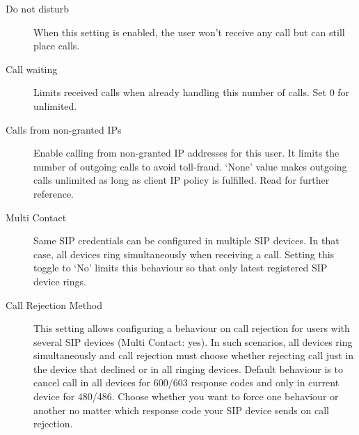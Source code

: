 \documentclass[letterpaper,10pt,spanish]{sphinxmanual}
\begin{document}
\begin{description}
\item[{Do not disturb}] \leavevmode{}\label{administration_portal/client/vpbx/users:term-do-not-disturb}
When this setting is enabled, the user won't receive any call but can
still place calls.

\item[{Call waiting}] \leavevmode{}\label{administration_portal/client/vpbx/users:term-call-waiting}
Limits received calls when already handling this number of calls. Set 0 for unlimited.

\item[{Calls from non-granted IPs}] \leavevmode{}\label{administration_portal/client/vpbx/users:term-calls-from-non-granted-ips}
Enable calling from non-granted IP addresses for this user.
It limits the number of outgoing calls to avoid toll-fraud.
`None' value makes outgoing calls unlimited as long as client IP
policy is fulfilled. Read {\hyperref[security_and_maintenance/security/authorized_ip_ranges:roadwarrior\string-users]{}} for further reference.

\item[{Multi Contact}] \leavevmode{}\label{administration_portal/client/vpbx/users:term-multi-contact}
Same SIP credentials can be configured in multiple SIP devices. In that case, all devices ring
simultaneously when receiving a call. Setting this toggle to `No' limits this behaviour so that
only latest registered SIP device rings.

\item[{Call Rejection Method}] \leavevmode{}\label{administration_portal/client/vpbx/users:term-call-rejection-method}
This setting allows configuring a behaviour on call rejection for users with several
SIP devices (Multi Contact: yes). In such scenarios, all devices ring simultaneously and call rejection must
choose whether rejecting call just in the device that declined or in all ringing devices.
Default behaviour is to cancel call in all devices for 600/603 response codes and only in
current device for 480/486. Choose whether you want to force one behaviour or another no
matter which response code your SIP device sends on call rejection.

\end{description}
\end{document}
